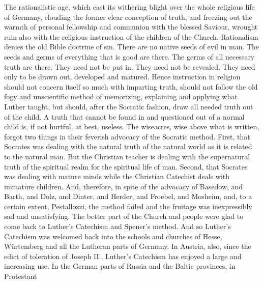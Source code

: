  The rationalistic age, which cast its withering blight over the whole religious life of Germany, clouding the former clear conception of truth, and freezing out the warmth of personal fellowship and communion with the blessed Saviour, wrought ruin also with the religious instruction of the children of the Church. Rationalism denies the old Bible doctrine of sin. There are no native seeds of evil in man. The seeds and germs of everything that is good are there. The germs of all necessary truth are there. They need not be put in. They need not be revealed. They need only to be drawn out, developed and matured. Hence instruction in religion should not concern itself so much with imparting truth, should not follow the old fogy and
unscientific method of memorizing, explaining and applying what Luther taught, but should, after the Socratic fashion, draw all needed truth out of the child. A truth that cannot be found in and questioned out of a normal child is, if not hurtful, at best, useless. The wiseacres, wise above what is written, forgot two things in their feverish advocacy of the Socratic method. First, that Socrates was dealing with the natural truth of the natural world as it is related to the natural man. But the Christian teacher is dealing with the supernatural truth of the spiritual realm for the spiritual life of man. Second, that Socrates was dealing with mature minds while the Christian Catechist deals with immature children. And, therefore, in spite of the advocacy of Basedow, and Barth, and Dolz, and Dinter, and Herder, and Froebel, and Mosheim, and, to a certain extent, Pestallozzi, the method failed and the fruitage was inexpressibly sad and unsatisfying. The better part of the Church and people were glad to come back to Luther’s Catechism and Spener’s method.  And so Luther’s Catechism was welcomed back into the schools and churches of Hesse, Würtemberg and all the Lutheran parts of Germany. In Austria, also, since the edict of toleration of Joseph II., Luther’s Catechism has enjoyed a large and increasing use. In the German parts of Russia and the Baltic provinces, in Protestant
